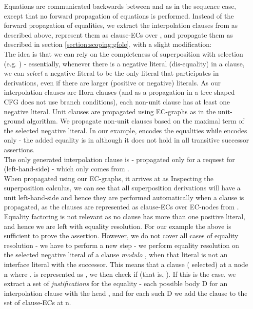 Equations are communicated backwards between  and  as in the sequence case, except that no forward propagation of equations is performed. 
Instead of the forward propagation of equalities, we extract the interpolation clauses from  as described above,
represent them as clause-ECs over , and propagate them as described in section \ref{section:scoping:gfole}, with a slight modification:\\
The idea is that we can rely on the completeness of superposition with selection (e.g. \cite{BachmairGanzingerSuperposition}) - 
essentially, whenever there is a negative literal (dis-equality) in a clause, we can \emph{select} a negative literal to be the only literal that participates in derivations, even if there are larger (positive or negative) literals. As our interpolation clauses are Horn-clauses (and as a propagation in a tree-shaped CFG does not use branch conditions), each non-unit clause has at least one negative literal.
Unit clauses are propagated using EC-graphs as in the unit-ground algorithm.
We propagate non-unit clauses based on the maximal term of the selected negative literal.
In our example,  encodes the equalities  while  encodes only
 - the added equality  is in  although it does not hold in all transitive successor assertions.\\
The only generated interpolation clause is  - propagated only for a request for  (left-hand-side) - which only comes from .\\
When propagated using our EC-graphs, it arrives at  as \m{[a_1] \neq [a_1] \lor [c]=[d]}
Inspecting the superposition calculus, we can see that all superposition derivations will have a unit left-hand-side and hence they are performed automatically when a clause is propagated, as the clauses are represented as clause-ECs over EC-nodes from .
Equality factoring is not relevant as no clause has more than one positive literal, and hence we are left with equality resolution.
For our example the above is sufficient to prove the assertion. 
However, we do not cover all cases of equality resolution - we have to perform a new step - we perform equality resolution on the selected negative literal of a clause \emph{modulo }, when that literal is not an interface literal with the successor.
This means that a clause  ( selected) at a node n where , 
is represented as , we then check if  (that is, ).
If this is the case, we extract a set of \emph{justifications} for the equality - each possible body D for an interpolation clause with the head , and for each such D we add the clause  to the set of clause-ECs at n.




